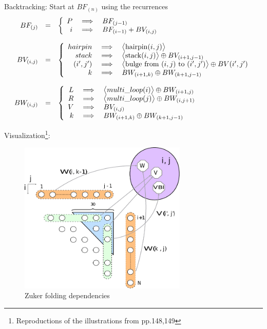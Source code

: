 \item Backtracking: Start at $BF_{(n)}$ using the recurrences
 \[\begin{array}{rcl}
	BF_{(j)} &=& \left\{\begin{array}{rcl} P&\implies& BF_{(j-1)} \\ i &\implies& BF_{(i-1)} + BV_{(i,j)} \end{array} \right.\\
	\\
	BV_{(i,j)} &=& \left\{\begin{array}{rcl}
		hairpin &\implies&\big< {\rm hairpin}(i,j) \big> \\
		stack &\implies& \big< {\rm stack}(i,j) \big> \oplus BV_{(i+1,j-1)} \\
		(i',j') &\implies& \big< \text{bulge from $(i,j)$ to }(i',j') \big> \oplus BV(i',j')\\
		k &\implies& BW_{(i+1,k)} \oplus BW_{(k+1,j-1)}
	\end{array}\right.\\
	\\
	BW_{(i,j)} &=& \left\{\begin{array}{rcl}
	L & \implies & \big< multi\_loop(i) \big> \oplus BW_{(i+1,j)} \\
	R & \implies & \big< multi\_loop(j) \big> \oplus BW_{(i,j+1)} \\
	V &\implies& BV_{(i,j)} \\
	k &\implies& BW_{(i+1,k)} \oplus BW_{(k+1,j-1)}
	\end{array}\right.
\end{array}\]

\item Visualization\footnote{Reproductions of the illustrations from \cite{para_dprec} pp.148,149}:
\begin{figure}[H]\begin{center}\includegraphics[width=8cm]{inc/zuker_rec.pdf}\end{center}\caption{Zuker folding dependencies}\end{figure}

